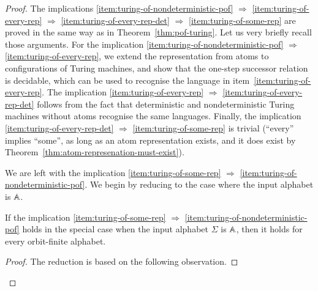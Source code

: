 \begin{proof}
	The implications  \ref{item:turing-of-nondeterministic-pof} $\Rightarrow$ \ref{item:turing-of-every-rep} $\Rightarrow$ \ref{item:turing-of-every-rep-det} $\Rightarrow$ \ref{item:turing-of-some-rep} are proved in the same way as in Theorem~\ref{thm:pof-turing}.  Let us very briefly recall those arguments. For the implication \ref{item:turing-of-nondeterministic-pof} $\Rightarrow$ \ref{item:turing-of-every-rep}, we extend the representation from atoms to configurations of Turing machines, and show that the one-step successor relation is decidable, which can be used to recognise the language in item~\ref{item:turing-of-every-rep}. The implication \ref{item:turing-of-every-rep} $\Rightarrow$ \ref{item:turing-of-every-rep-det} follows from the fact that deterministic and nondeterministic Turing machines without atoms  recognise the  same languages. Finally, the implication \ref{item:turing-of-every-rep-det} $\Rightarrow$ \ref{item:turing-of-some-rep} is trivial (``every'' implies ``some'', as long as an atom representation exists, and it does exist by Theorem~\ref{thm:atom-represenation-must-exist}).

	We are left with the implication \ref{item:turing-of-some-rep} $\Rightarrow$ \ref{item:turing-of-nondeterministic-pof}. 	
	We begin by reducing to the  case where the input alphabet is $\mathbb A$.
	
	\begin{lemma}\label{lem:reduction-to-atom-alphabet} If the implication \ref{item:turing-of-some-rep} $\Rightarrow$ \ref{item:turing-of-nondeterministic-pof} holds in the special case when the  input alphabet $\Sigma$ is $\mathbb A$, then it holds for every orbit-finite alphabet.
	\end{lemma}
	\begin{proof}
The reduction is based on the following observation.
		

\end{proof}
\end{proof}

